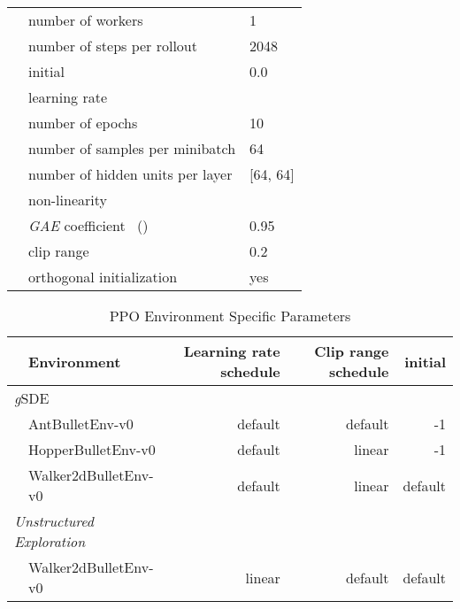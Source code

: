 \documentclass{article}
\newcommand{\ourSDE}{\textit{g}\textsc{SDE}\xspace}
\newcommand{\ppo}{\textsc{PPO}\xspace}
\begin{document}
\begin{table}[h]
\begin{tabular}{@{}l l| l@{}}
    & number of workers &  1\\
    & number of steps per rollout & 2048\\
    & initial  & 0.0\\
    & learning rate & \\
    & number of epochs & 10\\
    & number of samples per minibatch & 64\\
    & number of hidden units per layer & [64, 64]\\
    & non-linearity & \\
    & \textit{GAE} coefficient~\citep{schulman2015high} () &  0.95\\
    & clip range & 0.2 \\
    & orthogonal initialization~\citep{engstrom2020implementation} & yes \\

    \bottomrule
  \end{tabular}
\end{table}


\begin{table}[h]
\renewcommand{\arraystretch}{1.1}
\centering
\caption{\ppo Environment Specific Parameters}
\label{tab:env_params}
\vspace{1mm}
  \begin{tabular}{@{}l l r r r@{}}
    \toprule
    & Environment 	& Learning rate schedule & Clip range schedule & initial \\
    \midrule
    \multicolumn{2}{l}{\ourSDE}& \\
      & AntBulletEnv-v0 & default & default & -1\\
      & HopperBulletEnv-v0 & default & linear & -1\\
      & Walker2dBulletEnv-v0 & default & linear & default\\
    \midrule
    \multicolumn{2}{l}{\textit{Unstructured Exploration}}& \\
      & Walker2dBulletEnv-v0 & linear & default & default\\
    \bottomrule
  \end{tabular}
\end{table}
\end{document}
